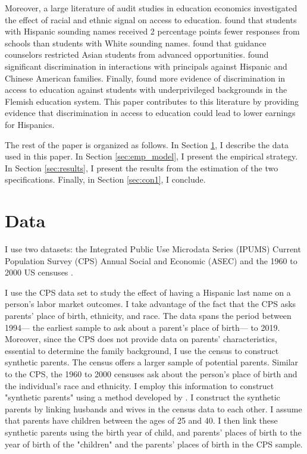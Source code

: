 Moreover, a large literature of audit studies in education economics investigated the effect of racial and ethnic signal on access to education. \textcite{bergman2018education} found that students with Hispanic sounding names received 2 percentage points fewer responses from schools than students with White sounding names. \textcite{janssen2022guidance} found that guidance counselors restricted Asian students from advanced opportunities. \textcite{gaddis2024racial} found significant discrimination in interactions with principals against Hispanic and Chinese American families. Finally, \textcite{bourabain2023school} found more evidence of discrimination in access to education against students with underprivileged backgrounds in the Flemish education system. This paper contributes to this literature by providing evidence that discrimination in access to education could lead to lower earnings for Hispanics. 

The rest of the paper is organized as follows. In Section \ref{sec:data}, I describe the data used in this paper. In Section \ref{sec:emp_model}, I present the empirical strategy. In Section \ref{sec:results}, I present the results from the estimation of the two specifications. Finally, in Section \ref{sec:con1}, I conclude.

\section{Data}\label{sec:data}

I use two datasets:  the Integrated Public Use Microdata Series (IPUMS) Current Population Survey (CPS) Annual Social and Economic (ASEC) \autocite{cps2019} and the 1960 to 2000 US censuses \autocite{acs2019}. 

I use the CPS data set to study the effect of having a Hispanic last name on a person's labor market outcomes. I take advantage of the fact that the CPS asks parents' place of birth, ethnicity, and race. The data spans the period between 1994--- the earliest sample to ask about a parent's place of birth--- to 2019. Moreover, since the CPS does not provide data on parents' characteristics, essential to determine the family background, I use the census to construct synthetic parents. The census offers a larger sample of potential parents. Similar to the CPS, the 1960 to 2000 censuses ask about the person's place of birth and the individual's race and ethnicity. I employ this information to construct "synthetic parents" using a method developed by \textcite{rubinstein2014pride}. I construct the synthetic parents by linking husbands and wives in the census data to each other. I assume that parents have children between the ages of 25 and 40. I then link these synthetic parents using the birth year of child, and parents' places of birth to the year of birth of the "children" and the parents' places of birth in the CPS sample.

